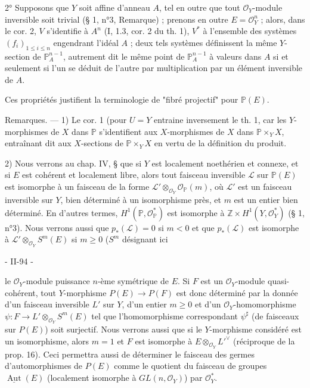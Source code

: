 2° Supposons que $Y$ soit affine d'anneau $A$, tel en outre que tout $\mathcal{O}_Y$-module inversible soit trivial (§ 1, n°3, Remarque) ; prenons en outre $E=\mathcal{O}_Y^n$ ; alors, dans le cor. 2, $V$ s'identifie à $A^n$ (I, 1.3, cor. 2 du th. 1), $V^*$ à l'ensemble des systèmes $(f_i)_{1 \le i \le n}$ engendrant l'idéal $A$ ; deux tels systèmes définissent la même $Y$-section de $\mathbb{P}_A^{n-1}$, autrement dit le même point de $\mathbb{P}_A^{n-1}$ à valeurs dans $A$ si et seulement si l'un se déduit de l'autre par multiplication par un élément inversible de $A$.

Ces propriétés justifient la terminologie de "fibré projectif" pour $\mathbb{P}(E)$.

Remarques. — 1) Le cor. 1 (pour $U=Y$ entraine inversement le th. 1, car les $Y$-morphismes de $X$ dans $\mathbb{P}$ s'identifient aux $X$-morphismes de $X$ dans $\mathbb{P} \times_Y X$, entraînant dit aux $X$-sections de $\mathbb{P} \times_Y X$ en vertu de la définition du produit.

2) Nous verrons au chap. IV, § que si $Y$ est localement noethérien et connexe, et si $E$ est cohérent et localement libre, alors tout faisceau inversible $\mathcal{L}$ sur $\mathbb{P}(E)$ est isomorphe à un faisceau de la forme $\mathcal{L}' \otimes_{\mathcal{O}_Y} \mathcal{O}_{\mathbb{P}}(m)$, où $\mathcal{L}'$ est un faisceau inversible sur $Y$, bien déterminé à un isomorphisme près, et $m$ est un entier bien déterminé. En d'autres termes, $H^1(\mathbb{P}, \mathcal{O}_{\mathbb{P}}^*)$ est isomorphe à $\mathbb{Z} \times H^1(Y, \mathcal{O}_Y^*)$ (§ 1, n°3). Nous verrons aussi que $p_*(\mathcal{L}) = 0$ si $m < 0$ et que $p_*(\mathcal{L})$ est isomorphe à $\mathcal{L}' \otimes_{\mathcal{O}_Y} S^m(E)$ si $m \ge 0$ ($S^m$ désignant ici

\newpage


- II-94 -

le $\mathcal{O}_Y$-module puissance $n$-ème symétrique de $E$. Si $F$ est un $\mathcal{O}_Y$-module quasi-cohérent, tout $Y$-morphisme $P(E) \to P(F)$ est donc déterminé par la donnée d'un faisceau inversible $L'$ sur $Y$, d'un entier $m \ge 0$ et d'un $\mathcal{O}_Y$-homomorphisme $\psi : F \to L' \otimes_{\mathcal{O}_Y} S^m(E)$ tel que l'homomorphisme correspondant $\psi^\sharp$ (de faisceaux sur $P(E)$) soit surjectif. Nous verrons aussi que si le $Y$-morphisme considéré est un isomorphisme, alors $m=1$ et $F$ est isomorphe à $E \otimes_{\mathcal{O}_Y} L'^{\vee}$ (réciproque de la prop. 16). Ceci permettra aussi de déterminer le faisceau des germes d'automorphismes de $P(E)$ comme le quotient du faisceau de groupes $\underline{\operatorname{Aut}}(E)$ (localement isomorphe à $GL(n, \mathcal{O}_Y)$) par $\mathcal{O}_Y^*$.

